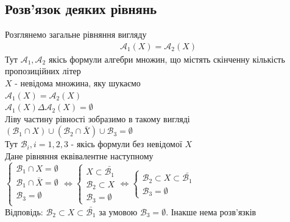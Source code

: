\documentclass[a4paper, 14pt]{extarticle}
\theoremstyle{theoremdd}
\theoremstyle{theoremdd}
\theoremstyle{theoremdd}
\theoremstyle{theoremdd}
\theoremstyle{theoremdd}
\theoremstyle{theoremdd}
\theoremstyle{theoremdd}
\theoremstyle{theoremdd}
\begin{document}
\subsection{Розв'язок деяких рівнянь}
Розглянемо загальне рівняння вигляду
\begin{align*}
\mathcal{A}_1(X) = \mathcal{A}_2(X)
\end{align*}
Тут $\mathcal{A}_1, \mathcal{A}_2$ якісь формули алгебри множин, що містять скінченну кількість пропозиційних літер\\
$X$ - невідома множина, яку шукаємо\\
$\mathcal{A}_1(X) = \mathcal{A}_2(X)$\\
$\mathcal{A}_1(X) \Delta \mathcal{A}_2(X) = \emptyset$\\
Ліву частину рівності зобразимо в такому вигляді\\
$(\mathcal{B}_1 \cap X) \cup (\mathcal{B}_2 \cap \bar{X}) \cup \mathcal{B}_3 = \emptyset$\\
Тут $\mathcal{B}_i, i =1,2,3$ - якісь формули без невідомої $X$\\
Дане рівняння еквівалентне наступному\\
$\begin{cases}
\mathcal{B}_1 \cap X = \emptyset\\
\mathcal{B}_1 \cap \bar{X} = \emptyset\\
\mathcal{B}_3 = \emptyset\\
\end{cases}
 \iff 
 \begin{cases}
 X \subset \bar{\mathcal{B}_1} \\
 \mathcal{B}_2 \subset X \\
 \mathcal{B}_3 = \emptyset
 \end{cases} \iff 
 \begin{cases}
 \mathcal{B}_2 \subset X \subset \bar{\mathcal{B}_1} \\
 \mathcal{B}_3 = \emptyset
 \end{cases}$
 \\
 Відповідь: $\mathcal{B}_2 \subset X \subset \bar{\mathcal{B}_1}$ за умовою $\mathcal{B}_3 = \emptyset$. Інакше нема розв'язків
 
\end{document}
